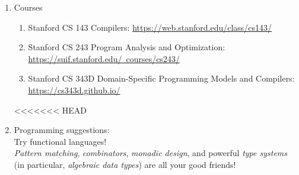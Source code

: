 \documentclass{article}
\begin{document}
\begin{enumerate}
    \item Courses
    \begin{enumerate}
        \item Stanford CS 143 Compilers:
        \href{https://web.stanford.edu/class/cs143/}{https://web.stanford.edu/class/cs143/}
        \item Stanford CS 243 Program Analysis and Optimization:\\
        \href{https://suif.stanford.edu/~courses/cs243/}{https://suif.stanford.edu/~courses/cs243/}
        \item Stanford CS 343D Domain-Specific Programming Models and Compilers:\\
        \href{https://cs343d.github.io/}{https://cs343d.github.io/}
    \end{enumerate}

<<<<<<< HEAD
    \item Programming suggestions:\\
    Try functional languages!\\
    \emph{Pattern matching}, \emph{combinators}, \emph{monadic design}, and powerful \emph{type systems} (in particular, \emph{algebraic data types}) are all your good friends!


\end{enumerate}
\end{document}
